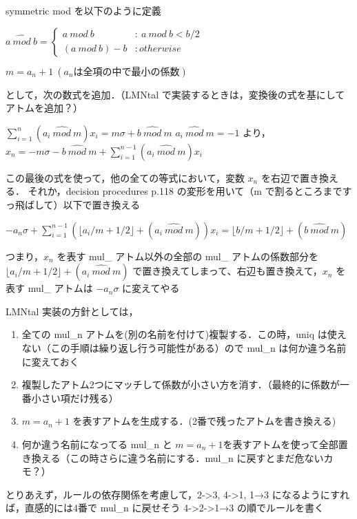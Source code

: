 symmetric mod を以下のように定義
\begin{center}
    $ a \: \widehat{mod}\: b = 
    \begin{cases}
        a \:mod\: b & :\:a \:mod\: b < b/2\\
        (a\:mod\:b)-b & :otherwise
    \end{cases}
    $
\end{center}

\begin{center}
    $m = a_n + 1 \:(a_n は全項の中で最小の係数)$
\end{center}
として，次の数式を追加．（LMNtal で実装するときは，変換後の式を基にしてアトムを追加？）
\begin{center}
    $\sum_{i=1}^n(a_i \:\widehat{mod}\: m)x_i = m \sigma + b \:\widehat{mod}\: m$
    $a_i \:\widehat{mod}\: m = -1$ より，
    $x_n = -m \sigma - b \:\widehat{mod}\:m + \sum_{i=1}^{n-1}(a_i \:\widehat{mod}\: m)x_i$
\end{center}
この最後の式を使って，他の全ての等式において，変数 $x_n$ を右辺で置き換える．
それか，decision procedures p.118 の変形を用いて（m で割るところまですっ飛ばして）以下で置き換える
\begin{center}
    $-a_n\sigma + \sum_{i=1}^{n-1}(\lfloor a_i/m + 1/2 \rfloor + (a_i \:\widehat{mod}\: m))x_i = 
    \lfloor b/m + 1/2 \rfloor + (b \:\widehat{mod}\: m)$
\end{center}
つまり，$x_n$ を表す mul\_ アトム以外の全部の mul\_ アトムの係数部分を $\lfloor a_i/m + 1/2 \rfloor + (a_i \:\widehat{mod}\: m)$
で置き換えてしまって、右辺も置き換えて，$x_n$ を表す mul\_ アトムは $-a_n\sigma$ に変えてやる

LMNtal 実装の方針としては，
\begin{enumerate}
    \item 全ての mul_n アトムを(別の名前を付けて)複製する．この時，uniq は使えない（この手順は繰り返し行う可能性がある）ので mul_n は何か違う名前に変えておく
    \item 複製したアトム2つにマッチして係数が小さい方を消す．（最終的に係数が一番小さい項だけ残る）
    \item $m = a_n + 1$ を表すアトムを生成する．(2番で残ったアトムを書き換える)
    \item 何か違う名前になってる mul_n と $m=a_n+1$を表すアトムを使って全部置き換える（この時さらに違う名前にする．mul_n に戻すとまだ危ないカモ？）
\end{enumerate}
とりあえず，ルールの依存関係を考慮して，2->3, 4->1, 1→3 になるようにすれば，直感的には4番で mul_n に戻せそう
4->2->1→3 の順でルールを書く



